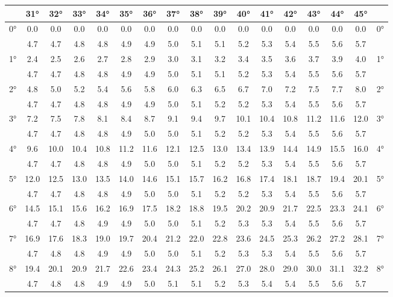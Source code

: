 \begin{footnotesize}\begin{tabular}{c || c | c | c | c | c | c | c | c | c | c | c | c | c | c | c || c}
		\space &31°&32°&33°&34°&35°&36°&37°&38°&39°&40°&41°&42°&43°&44°&45°\\\hline\hline
		\multirow{2}{*}{0°}&0.0&0.0&0.0&0.0&0.0&0.0&0.0&0.0&0.0&0.0&0.0&0.0&0.0&0.0&0.0&\multirow{2}{*}{0°}\\ \space&4.7&4.7&4.8&4.8&4.9&4.9&5.0&5.1&5.1&5.2&5.3&5.4&5.5&5.6&5.7&\space\\\hline
		\multirow{2}{*}{1°}&2.4&2.5&2.6&2.7&2.8&2.9&3.0&3.1&3.2&3.4&3.5&3.6&3.7&3.9&4.0&\multirow{2}{*}{1°}\\ \space&4.7&4.7&4.8&4.8&4.9&4.9&5.0&5.1&5.1&5.2&5.3&5.4&5.5&5.6&5.7&\space\\\hline
		\multirow{2}{*}{2°}&4.8&5.0&5.2&5.4&5.6&5.8&6.0&6.3&6.5&6.7&7.0&7.2&7.5&7.7&8.0&\multirow{2}{*}{2°}\\ \space&4.7&4.7&4.8&4.8&4.9&4.9&5.0&5.1&5.2&5.2&5.3&5.4&5.5&5.6&5.7&\space\\\hline
		\multirow{2}{*}{3°}&7.2&7.5&7.8&8.1&8.4&8.7&9.1&9.4&9.7&10.1&10.4&10.8&11.2&11.6&12.0&\multirow{2}{*}{3°}\\ \space&4.7&4.7&4.8&4.8&4.9&5.0&5.0&5.1&5.2&5.2&5.3&5.4&5.5&5.6&5.7&\space\\\hline
		\multirow{2}{*}{4°}&9.6&10.0&10.4&10.8&11.2&11.6&12.1&12.5&13.0&13.4&13.9&14.4&14.9&15.5&16.0&\multirow{2}{*}{4°}\\ \space&4.7&4.7&4.8&4.8&4.9&5.0&5.0&5.1&5.2&5.2&5.3&5.4&5.5&5.6&5.7&\space\\\hline
		\multirow{2}{*}{5°}&12.0&12.5&13.0&13.5&14.0&14.6&15.1&15.7&16.2&16.8&17.4&18.1&18.7&19.4&20.1&\multirow{2}{*}{5°}\\ \space&4.7&4.7&4.8&4.8&4.9&5.0&5.0&5.1&5.2&5.2&5.3&5.4&5.5&5.6&5.7&\space\\\hline
		\multirow{2}{*}{6°}&14.5&15.1&15.6&16.2&16.9&17.5&18.2&18.8&19.5&20.2&20.9&21.7&22.5&23.3&24.1&\multirow{2}{*}{6°}\\ \space&4.7&4.7&4.8&4.9&4.9&5.0&5.0&5.1&5.2&5.3&5.3&5.4&5.5&5.6&5.7&\space\\\hline
		\multirow{2}{*}{7°}&16.9&17.6&18.3&19.0&19.7&20.4&21.2&22.0&22.8&23.6&24.5&25.3&26.2&27.2&28.1&\multirow{2}{*}{7°}\\ \space&4.7&4.8&4.8&4.9&4.9&5.0&5.0&5.1&5.2&5.3&5.3&5.4&5.5&5.6&5.7&\space\\\hline
		\multirow{2}{*}{8°}&19.4&20.1&20.9&21.7&22.6&23.4&24.3&25.2&26.1&27.0&28.0&29.0&30.0&31.1&32.2&\multirow{2}{*}{8°}\\ \space&4.7&4.8&4.8&4.9&4.9&5.0&5.1&5.1&5.2&5.3&5.4&5.4&5.5&5.6&5.7&\space\\\hline

\end{tabular}
\end{footnotesize}
